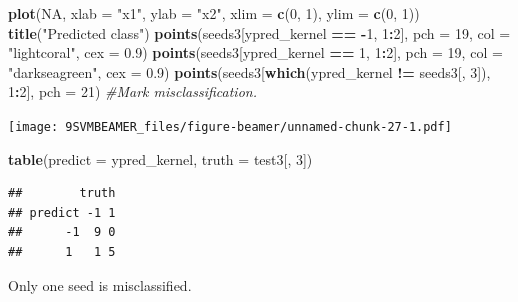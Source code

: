 \documentclass[ignorenonframetext,]{beamer}
\newenvironment{Shaded}{\begin{snugshade}}{\end{snugshade}}
\newcommand{\KeywordTok}[1]{\textcolor[rgb]{0.13,0.29,0.53}{\textbf{#1}}}
\newcommand{\DataTypeTok}[1]{\textcolor[rgb]{0.13,0.29,0.53}{#1}}
\newcommand{\DecValTok}[1]{\textcolor[rgb]{0.00,0.00,0.81}{#1}}
\newcommand{\FloatTok}[1]{\textcolor[rgb]{0.00,0.00,0.81}{#1}}
\newcommand{\StringTok}[1]{\textcolor[rgb]{0.31,0.60,0.02}{#1}}
\newcommand{\CommentTok}[1]{\textcolor[rgb]{0.56,0.35,0.01}{\textit{#1}}}
\newcommand{\OtherTok}[1]{\textcolor[rgb]{0.56,0.35,0.01}{#1}}
\newcommand{\OperatorTok}[1]{\textcolor[rgb]{0.81,0.36,0.00}{\textbf{#1}}}
\newcommand{\NormalTok}[1]{#1}
\begin{document}
\begin{frame}[fragile]

\begin{Shaded}
\begin{Highlighting}[]
\KeywordTok{plot}\NormalTok{(}\OtherTok{NA}\NormalTok{, }\DataTypeTok{xlab =} \StringTok{"x1"}\NormalTok{, }\DataTypeTok{ylab =} \StringTok{"x2"}\NormalTok{, }\DataTypeTok{xlim =} \KeywordTok{c}\NormalTok{(}\DecValTok{0}\NormalTok{, }\DecValTok{1}\NormalTok{), }\DataTypeTok{ylim =} \KeywordTok{c}\NormalTok{(}\DecValTok{0}\NormalTok{, }\DecValTok{1}\NormalTok{))}
\KeywordTok{title}\NormalTok{(}\StringTok{"Predicted class"}\NormalTok{)}
\KeywordTok{points}\NormalTok{(seeds3[ypred_kernel }\OperatorTok{==}\StringTok{ }\OperatorTok{-}\DecValTok{1}\NormalTok{, }\DecValTok{1}\OperatorTok{:}\DecValTok{2}\NormalTok{], }\DataTypeTok{pch =} \DecValTok{19}\NormalTok{, }\DataTypeTok{col =} \StringTok{"lightcoral"}\NormalTok{, }
    \DataTypeTok{cex =} \FloatTok{0.9}\NormalTok{)}
\KeywordTok{points}\NormalTok{(seeds3[ypred_kernel }\OperatorTok{==}\StringTok{ }\DecValTok{1}\NormalTok{, }\DecValTok{1}\OperatorTok{:}\DecValTok{2}\NormalTok{], }\DataTypeTok{pch =} \DecValTok{19}\NormalTok{, }\DataTypeTok{col =} \StringTok{"darkseagreen"}\NormalTok{, }
    \DataTypeTok{cex =} \FloatTok{0.9}\NormalTok{)}
\KeywordTok{points}\NormalTok{(seeds3[}\KeywordTok{which}\NormalTok{(ypred_kernel }\OperatorTok{!=}\StringTok{ }\NormalTok{seeds3[, }\DecValTok{3}\NormalTok{]), }\DecValTok{1}\OperatorTok{:}\DecValTok{2}\NormalTok{], }\DataTypeTok{pch =} \DecValTok{21}\NormalTok{)  }\CommentTok{#Mark misclassification.}
\end{Highlighting}
\end{Shaded}

\texttt{[image: 9SVMBEAMER\_files/figure-beamer/unnamed-chunk-27-1.pdf]}

\begin{Shaded}
\begin{Highlighting}[]
\KeywordTok{table}\NormalTok{(}\DataTypeTok{predict =}\NormalTok{ ypred_kernel, }\DataTypeTok{truth =}\NormalTok{ test3[, }\DecValTok{3}\NormalTok{])}
\end{Highlighting}
\end{Shaded}

\begin{verbatim}
##        truth
## predict -1 1
##      -1  9 0
##      1   1 5
\end{verbatim}

Only one seed is misclassified.

\end{frame}
\end{document}
